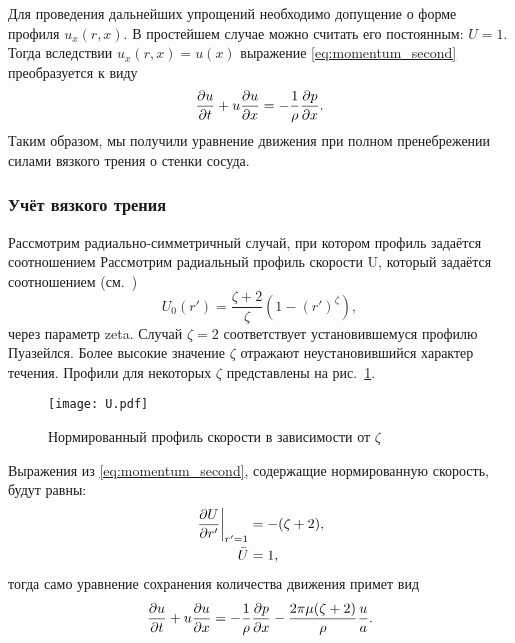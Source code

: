 Для проведения дальнейших упрощений необходимо допущение о форме профиля $u_x(r, x)$.
В простейшем случае можно считать его постоянным: $U=1$. Тогда вследствии $u_x(r, x) = u(x)$
выражение \cref{eq:momentum_second} преобразуется к виду
\begin{equation}
\label{eq:momentum_conservation_inviscid}
\frac{\partial u}{\partial t} + u\frac{\partial u}{\partial x} = -\frac{1}{\rho} \frac{\partial p}{\partial x}.
\end{equation}
Таким образом, мы получили уравнение движения при полном пренебрежении
силами вязкого трения о стенки сосуда.

\subsubsection{Учёт вязкого трения}
Рассмотрим радиально-симметричный случай, при котором профиль задаётся соотношением
Рассмотрим радиальный профиль скорости \gls{U}, который задаётся соотношением (см.~\cite{Hughes1973,Smith2001})
\begin{equation}
U_0(r') = \frac{\zeta+2}{\zeta} \left(1 - \left(r'\right)^{\zeta}\right),
\end{equation}
через параметр \gls{zeta}. Случай $\zeta=2$ соответствует установившемуся профилю Пуазейлся.
Более высокие значение $\zeta$ отражают неустановившийся характер течения.
Профили для некоторых $\zeta$ представлены на рис.~\ref{fig:U}.


\begin{figure}[h]
    \centering
    \texttt{[image: U.pdf]}
    \caption{Нормированный профиль скорости в зависимости от $\zeta$}
    \label{fig:U}
\end{figure}

Выражения из \cref{eq:momentum_second}, содержащие нормированную скорость, будут равны:
\begin{align*}
\left.\frac{\partial U}{\partial r'}\right|_{r'=1} &= - (\zeta+2),\\
\bar U &= 1,
\end{align*}
тогда само уравнение сохранения количества движения примет вид
\begin{equation}
\label{eq:momentum_conservation_viscous}
\frac{\partial u}{\partial t} + u\frac{\partial u}{\partial x} =
	-\frac{1}{\rho} \frac{\partial p}{\partial x} - \frac{2\pi\mu(\zeta+2)}{\rho}\frac{u}{a}.
\end{equation}

